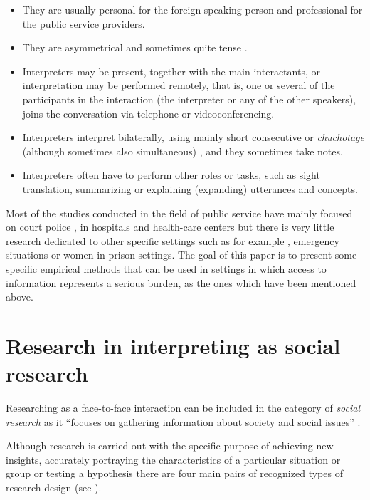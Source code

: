 \documentclass[output=paper]{LSP/langsci}
\begin{document}
\begin{itemize}
\item They are usually personal for the foreign speaking person and professional for the public service providers.
\item They are asymmetrical and sometimes quite tense \citep{Hale2007, Cambridge2002}.
\item Interpreters may be present, together with the main interactants, or interpretation may be performed remotely, that is, one or several of the participants in the interaction (the interpreter or any of the other speakers), joins the conversation via telephone or videoconferencing.
\item Interpreters interpret bilaterally, using mainly short consecutive or \textit{chuchotage} (although sometimes also simultaneous) , and they sometimes take notes. 
\item Interpreters often have to perform other roles or tasks, such as sight translation, summarizing or explaining (expanding) utterances and concepts.
\end{itemize}

Most of the studies conducted in the field of public service have mainly focused on court \citep{Atkinson1979, Edwards1995, Hale2004, Mikkelson2000, Moeketsi1999, Shlesinger2010} police  \citep{Ortega2005},  in hospitals and health-care centers \citep{Angelelli2004Medical, Bischoff2006, Davidson2000, Raga2006, Pochhacker2007, Lazaro2012, Valero2014} but there is very little research dedicated to other specific settings such as for example , emergency situations or women in prison settings. The goal of this paper is to present some specific empirical methods that can be used in settings in which access to information represents a serious burden, as the ones which have been mentioned above.


\section{Research in interpreting as social research}

Researching  as a face-to-face interaction \citep{Wadensjo1998} can be included in the category of \textit{social research} as it ``focuses on gathering information about society and social issues'' \citep[6]{Adams2006}. 

Although research is carried out with the specific purpose of achieving new insights, accurately portraying the characteristics of a particular situation or group or testing a hypothesis \citep[3]{Kumar2008} there are four main pairs of recognized types of research design (see ). 
\end{document}
